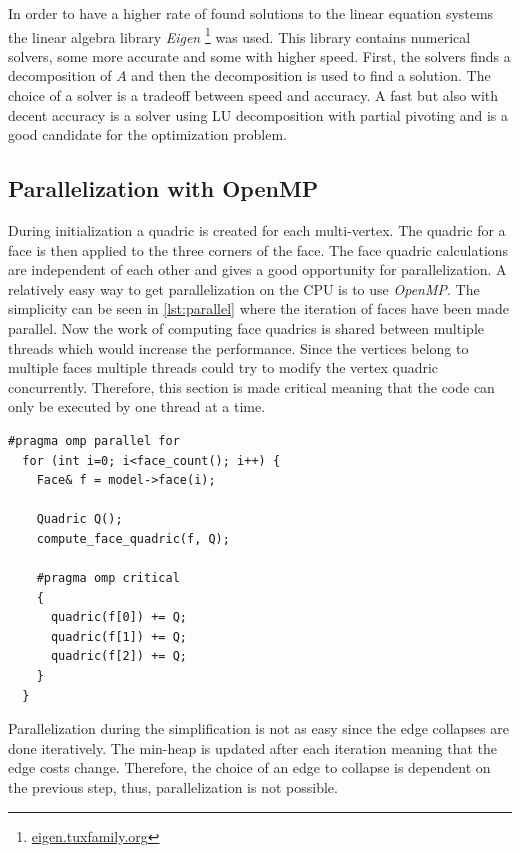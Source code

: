 In order to have a higher rate of found solutions to the linear equation systems the linear algebra library \emph{Eigen} \footnote{\href{http://eigen.tuxfamily.org}{eigen.tuxfamily.org}} was used. This library contains numerical solvers, some more accurate and some with higher speed. First, the solvers finds a decomposition of $A$ and then the decomposition is used to find a solution. The choice of a solver is a tradeoff between speed and accuracy. A fast but also with decent accuracy is a solver using LU decomposition with partial pivoting and is a good candidate for the optimization problem. 

\subsection{Parallelization with OpenMP}
During initialization a quadric is created for each multi-vertex. The quadric for a face is then applied to the three corners of the face. The face quadric calculations are independent of each other and gives a good opportunity for parallelization. A relatively easy way to get parallelization on the CPU is to use \emph{OpenMP}. The simplicity can be seen in \cref{lst:parallel} where the iteration of faces have been made parallel. Now the work of computing face quadrics is shared between multiple threads which would increase the performance. Since the vertices belong to multiple faces multiple threads could try to modify the vertex quadric concurrently. Therefore, this section is made critical meaning that the code can only be executed by one thread at a time.


\begin{minipage}{\linewidth}
\begin{lstlisting}[caption={Parallelization with OpenMP}, label={lst:parallel}]
  #pragma omp parallel for
  for (int i=0; i<face_count(); i++) {
    Face& f = model->face(i);

    Quadric Q();
    compute_face_quadric(f, Q);

    #pragma omp critical
    {
      quadric(f[0]) += Q;
      quadric(f[1]) += Q;
      quadric(f[2]) += Q;
    }
  }
\end{lstlisting}
\end{minipage}

Parallelization during the simplification is not as easy since the edge collapses are done iteratively. The min-heap is updated after each iteration meaning that the edge costs change. Therefore, the choice of an edge to collapse is dependent on the previous step, thus, parallelization is not possible.

